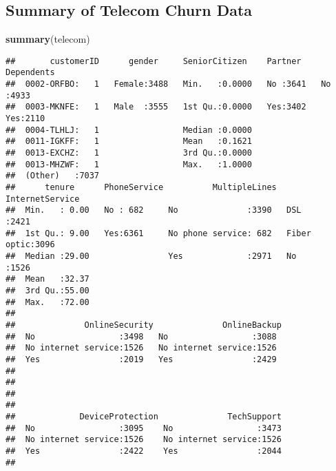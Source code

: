 \documentclass[]{article}
\newenvironment{Shaded}{\begin{snugshade}}{\end{snugshade}}
\newcommand{\KeywordTok}[1]{\textcolor[rgb]{0.13,0.29,0.53}{\textbf{#1}}}
\newcommand{\NormalTok}[1]{#1}
\begin{document}
\subsection{Summary of Telecom Churn
Data}\label{summary-of-telecom-churn-data}

\begin{Shaded}
\begin{Highlighting}[]
\KeywordTok{summary}\NormalTok{(telecom)}
\end{Highlighting}
\end{Shaded}

\begin{verbatim}
##       customerID      gender     SeniorCitizen    Partner    Dependents
##  0002-ORFBO:   1   Female:3488   Min.   :0.0000   No :3641   No :4933  
##  0003-MKNFE:   1   Male  :3555   1st Qu.:0.0000   Yes:3402   Yes:2110  
##  0004-TLHLJ:   1                 Median :0.0000                        
##  0011-IGKFF:   1                 Mean   :0.1621                        
##  0013-EXCHZ:   1                 3rd Qu.:0.0000                        
##  0013-MHZWF:   1                 Max.   :1.0000                        
##  (Other)   :7037                                                       
##      tenure      PhoneService          MultipleLines     InternetService
##  Min.   : 0.00   No : 682     No              :3390   DSL        :2421  
##  1st Qu.: 9.00   Yes:6361     No phone service: 682   Fiber optic:3096  
##  Median :29.00                Yes             :2971   No         :1526  
##  Mean   :32.37                                                          
##  3rd Qu.:55.00                                                          
##  Max.   :72.00                                                          
##                                                                         
##              OnlineSecurity              OnlineBackup 
##  No                 :3498   No                 :3088  
##  No internet service:1526   No internet service:1526  
##  Yes                :2019   Yes                :2429  
##                                                       
##                                                       
##                                                       
##                                                       
##             DeviceProtection              TechSupport  
##  No                 :3095    No                 :3473  
##  No internet service:1526    No internet service:1526  
##  Yes                :2422    Yes                :2044  
##                                                        

\end{verbatim}
\end{document}
